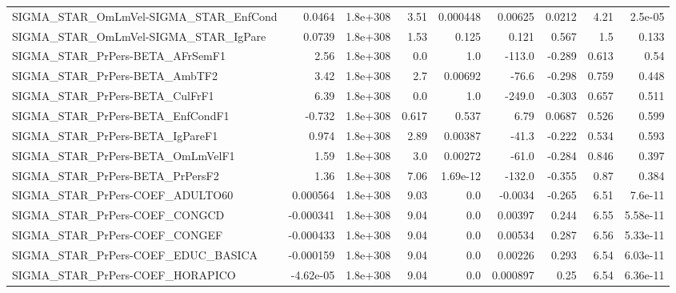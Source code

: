 \begin{tabular}{lrrrrrrrr}
SIGMA\_STAR\_OmLmVel-SIGMA\_STAR\_EnfCond &      0.0464 &     1.8e+308 &    3.51 & 0.000448 &    0.00625 &      0.0212 &         4.21 &       2.5e-05 \\
SIGMA\_STAR\_OmLmVel-SIGMA\_STAR\_IgPare  &      0.0739 &     1.8e+308 &    1.53 &    0.125 &      0.121 &       0.567 &          1.5 &         0.133 \\
SIGMA\_STAR\_PrPers-BETA\_AFrSemF1       &        2.56 &     1.8e+308 &     0.0 &      1.0 &     -113.0 &      -0.289 &        0.613 &          0.54 \\
SIGMA\_STAR\_PrPers-BETA\_AmbTF2         &        3.42 &     1.8e+308 &     2.7 &  0.00692 &      -76.6 &      -0.298 &        0.759 &         0.448 \\
SIGMA\_STAR\_PrPers-BETA\_CulFrF1        &        6.39 &     1.8e+308 &     0.0 &      1.0 &     -249.0 &      -0.303 &        0.657 &         0.511 \\
SIGMA\_STAR\_PrPers-BETA\_EnfCondF1      &      -0.732 &     1.8e+308 &   0.617 &    0.537 &       6.79 &      0.0687 &        0.526 &         0.599 \\
SIGMA\_STAR\_PrPers-BETA\_IgPareF1       &       0.974 &     1.8e+308 &    2.89 &  0.00387 &      -41.3 &      -0.222 &        0.534 &         0.593 \\
SIGMA\_STAR\_PrPers-BETA\_OmLmVelF1      &        1.59 &     1.8e+308 &     3.0 &  0.00272 &      -61.0 &      -0.284 &        0.846 &         0.397 \\
SIGMA\_STAR\_PrPers-BETA\_PrPersF2       &        1.36 &     1.8e+308 &    7.06 & 1.69e-12 &     -132.0 &      -0.355 &         0.87 &         0.384 \\
SIGMA\_STAR\_PrPers-COEF\_ADULTO60       &    0.000564 &     1.8e+308 &    9.03 &      0.0 &    -0.0034 &      -0.265 &         6.51 &       7.6e-11 \\
SIGMA\_STAR\_PrPers-COEF\_CONGCD         &   -0.000341 &     1.8e+308 &    9.04 &      0.0 &    0.00397 &       0.244 &         6.55 &      5.58e-11 \\
SIGMA\_STAR\_PrPers-COEF\_CONGEF         &   -0.000433 &     1.8e+308 &    9.04 &      0.0 &    0.00534 &       0.287 &         6.56 &      5.33e-11 \\
SIGMA\_STAR\_PrPers-COEF\_EDUC\_BASICA    &   -0.000159 &     1.8e+308 &    9.04 &      0.0 &    0.00226 &       0.293 &         6.54 &      6.03e-11 \\
SIGMA\_STAR\_PrPers-COEF\_HORAPICO       &   -4.62e-05 &     1.8e+308 &    9.04 &      0.0 &   0.000897 &        0.25 &         6.54 &      6.36e-11 \\

\end{tabular}
